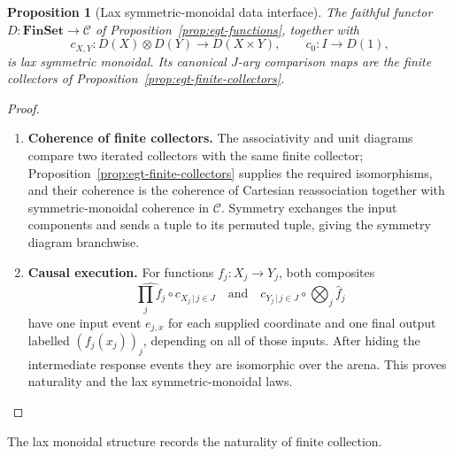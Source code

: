\documentclass[11pt,a4paper]{article}
\numberwithin{equation}{section}
\newtheorem{proposition}[theorem]{Proposition}
\theoremstyle{definition}
\theoremstyle{remark}
\theoremstyle{plain}
\begin{document}
\begin{proposition}[Lax symmetric-monoidal data interface]
\label{prop:egt-data-lax-monoidal}
The faithful functor $D:\mathbf{FinSet}\to\mathcal C$ of
Proposition~\ref{prop:egt-functions}, together with
\[
 c_{X,Y}:D(X)\otimes D(Y)\to D(X\times Y),
 \qquad c_0:I\to D(1),
\]
is lax symmetric monoidal. Its canonical $J$-ary comparison maps are the
finite collectors of Proposition~\ref{prop:egt-finite-collectors}.
\end{proposition}
\begin{proof}
\leavevmode
\begin{enumerate}[label=\textup{(\arabic*)},leftmargin=*,itemsep=4pt,topsep=3pt]
  \item \textbf{Coherence of finite collectors.} The associativity and unit diagrams compare two iterated collectors with the
same finite collector; Proposition~\ref{prop:egt-finite-collectors} supplies
the required isomorphisms, and their coherence is the coherence of Cartesian
reassociation together with symmetric-monoidal coherence in $\mathcal C$. Symmetry exchanges the input components and sends a tuple to its permuted
tuple, giving the symmetry diagram branchwise.
  \item \textbf{Causal execution.} For functions
$f_j:X_j\to Y_j$, both composites
\[
 \widehat{\prod_jf_j}\circ c_{X_j\,|\,j\in J}
 \quad\text{and}\quad
 c_{Y_j\,|\,j\in J}\circ\bigotimes_j\widehat f_j
\]
have one input event $e_{j,x}$ for each supplied coordinate and one final
output labelled $(f_j(x_j))_j$, depending on all of those inputs. After
hiding the intermediate response events they are isomorphic over the arena. This proves naturality and the lax symmetric-monoidal laws.
\end{enumerate}
\end{proof}

\noindent The lax monoidal structure records the naturality of finite collection.
\begin{center}
\end{center}
\end{document}
